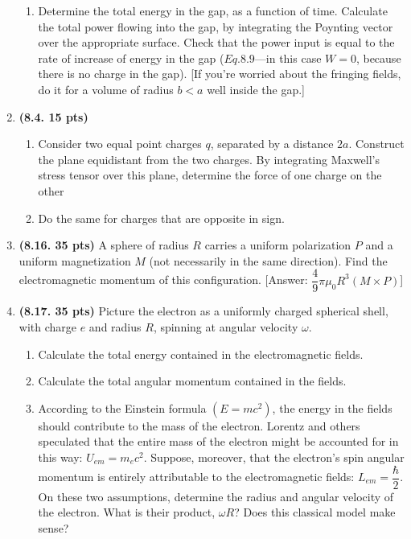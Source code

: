 \documentclass[fleqn]{article}
\begin{document}
\begin{enumerate}
\begin{enumerate}
      \item Determine the total energy in the gap, as a function of time. Calculate the total
      power flowing into the gap, by integrating the Poynting vector over the appropriate surface. 
      Check that the power input is equal to the rate of increase of energy in the gap ($Eq. 8.9$—in 
      this case $W=0$, because there is no charge in the gap). [If you’re worried about the fringing 
      fields, do it for a volume of radius $b < a$ well inside the gap.]
      
    \end{enumerate}

    \item \textbf{(8.4. 15 pts)}
    \begin{enumerate}
      \item Consider two equal point charges $q$, separated by a distance $2a$. Construct the
      plane equidistant from the two charges. By integrating Maxwell’s stress tensor
      over this plane, determine the force of one charge on the other


      \item Do the same for charges that are opposite in sign.

      
    \end{enumerate}


    \item \textbf{(8.16. 35 pts)} A sphere of radius $R$ carries a uniform polarization $P$ and a uniform
    magnetization $M$ (not necessarily in the same direction). Find the electromagnetic momentum of this configuration.
    [Answer: $\dfrac{4}{9} \pi \mu_0 R^3 (M \times P)$]
    


    \item \textbf{(8.17. 35 pts)} Picture the electron as a uniformly charged spherical shell, with
    charge $e$ and radius $R$, spinning at angular velocity $\omega$.
    \begin{enumerate}
      \item Calculate the total energy contained in the electromagnetic fields.


      \item Calculate the total angular momentum contained in the fields.


      \item According to the Einstein formula $(E = mc^2)$, the energy in the fields should
      contribute to the mass of the electron. Lorentz and others speculated that the
      entire mass of the electron might be accounted for in this way: $U_{em} = m_e c^2$.
      Suppose, moreover, that the electron’s spin angular momentum is entirely
      attributable to the electromagnetic fields: $L_{em}=\dfrac{\hbar}{2}$. On these two 
      assumptions, determine the radius and angular velocity of the electron. What is their
      product, $\omega R$? Does this classical model make sense?
      
    \end{enumerate}


  \end{enumerate}
\end{document}

